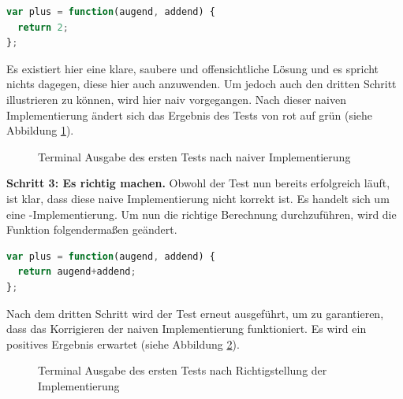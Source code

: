 \begin{lstlisting}[language=JavaScript]
var plus = function(augend, addend) {
  return 2;
};
\end{lstlisting}

Es existiert hier eine klare, saubere und offensichtliche Lösung und es spricht nichts dagegen, diese hier auch anzuwenden. Um jedoch auch den dritten Schritt illustrieren zu können, wird hier naiv vorgegangen.\newline
Nach dieser naiven Implementierung ändert sich das Ergebnis des Tests von rot auf grün (siehe Abbildung \ref{figure:tdd-simple-step-1-2}).

\begin{figure}[H]
  \centering
  \caption{Terminal Ausgabe des ersten Tests nach naiver Implementierung}
  \label{figure:tdd-simple-step-1-2}
\end{figure}

\textbf{Schritt 3: Es richtig machen.}\newline
Obwohl der Test nun bereits erfolgreich läuft, ist klar, dass diese naive Implementierung nicht korrekt ist. Es handelt sich um eine -Implementierung. Um nun die richtige Berechnung durchzuführen, wird die Funktion  folgendermaßen geändert.

\begin{lstlisting}[language=JavaScript]
var plus = function(augend, addend) {
  return augend+addend;
};
\end{lstlisting}

Nach dem dritten Schritt wird der Test erneut ausgeführt, um zu garantieren, dass das Korrigieren der naiven Implementierung funktioniert. Es wird ein positives Ergebnis erwartet (siehe Abbildung \ref{figure:tdd-simple-step-1-3}).

\begin{figure}[H]
  \centering
  \caption{Terminal Ausgabe des ersten Tests nach Richtigstellung der Implementierung}
  \label{figure:tdd-simple-step-1-3}
\end{figure}

